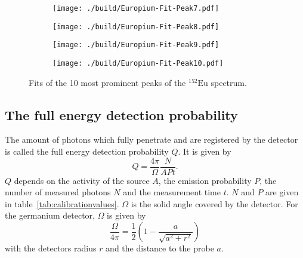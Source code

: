 \begin{figure}[H]
	\begin{adjustbox}{width=1.3\textwidth, center}
		\begin{subfigure}{.5\textwidth}
			\centering
			\texttt{[image: ./build/Europium-Fit-Peak7.pdf]}
		\end{subfigure}%
		\begin{subfigure}{.5\textwidth}
			\centering
			\texttt{[image: ./build/Europium-Fit-Peak8.pdf]}
		\end{subfigure}
	\end{adjustbox}
	\begin{adjustbox}{width=1.3\textwidth, center}
		\begin{subfigure}{.5\textwidth}
			\centering
			\texttt{[image: ./build/Europium-Fit-Peak9.pdf]}
		\end{subfigure}%
		\begin{subfigure}{.5\textwidth}
			\centering
			\texttt{[image: ./build/Europium-Fit-Peak10.pdf]}
		\end{subfigure}
	\end{adjustbox}
	\caption{Fits of the 10 most prominent peaks of the $^{152}\text{Eu}$ spectrum.}
\end{figure}
\FloatBarrier


\subsection{The full energy detection probability}
The amount of photons which fully penetrate and are registered by the detector is called the full energy
detection probability $Q$. It is given by
\begin{equation}
	Q = \frac{4 \pi}{\Omega}\frac{N}{APt}.
	\label{eqn:fullenergy}
\end{equation}
$Q$ depends on the activity of the source $A$, the emission probability $P$, the number of measured photons $N$ and
the measurement time $t$. $N$ and $P$ are given in
table~\ref{tab:calibrationvalues}. $\Omega$ is the solid angle covered by the
detector. For the germanium detector, $\Omega$ is given by
\begin{equation}
	\frac{\Omega}{4 \pi} = \frac{1}{2} \left( 1 - \frac{a}{\sqrt{a^{2} + r^{2}}} \right)
	\label{eqn:solidangle}
\end{equation}
with the detectors radius $r$ and the distance to the probe $a$.

